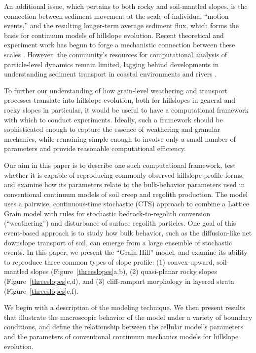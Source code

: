 \documentclass[esurf, manuscript]{copernicus}
\begin{document}
An additional issue, which pertains to both rocky and soil-mantled slopes, is the connection between sediment movement at the scale of individual ``motion events,'' and the resulting longer-term average sediment flux, which forms the basis for continuum models of hillslope evolution. Recent theoretical and experiment work has begun to forge a mechanistic connection between these scales \citep{culling1963soil,culling1965theory,furbish2009statistical,furbish2010divots,tucker2010trouble,gabet2012particle,lamb2013sediment}. However, the community's resources for computational analysis of particle-level dynamics remain limited, lagging behind developments in %
understanding sediment transport in coastal environments \citep{drake2001discrete} and rivers \citep{mcewan2001discrete,macvicar2006two,furbish2013probabilistic,schmeeckle2014numerical}.

To further our understanding of how grain-level weathering and transport processes translate into hillslope evolution, both for hillslopes in general and rocky slopes in particular, it would be useful to have a computational framework with which to conduct experiments. Ideally, such a framework should be sophisticated enough to capture the essence of weathering and granular mechanics, while remaining simple enough to involve only a small number of parameters and provide reasonable computational efficiency.

Our aim in this paper is to describe one such computational framework, test whether it is capable of reproducing commonly observed hillslope-profile forms, and examine how its parameters relate to the bulk-behavior parameters used in conventional continuum models of soil creep and regolith production. The model uses a pairwise, continuous-time stochastic (CTS) approach to combine a Lattice Grain model with rules for stochastic bedrock-to-regolith conversion (``weathering'') and disturbance of surface regolith particles. One goal of this event-based approach is to study how bulk behavior, such as the diffusion-like net downslope transport of soil, can emerge from a large ensemble of  stochastic events. In this paper, we present the ``Grain Hill'' model, and examine its ability to reproduce three common types of slope profile: (1) convex-upward, soil-mantled slopes (Figure~\ref{threeslopes}a,b), (2) quasi-planar rocky slopes (Figure~\ref{threeslopes}c,d), and (3) cliff-rampart morphology in layered strata (Figure~\ref{threeslopes}e,f).

We begin with a description of the modeling technique. We then present results that illustrate the macroscopic behavior of the model under a variety of boundary conditions, and define the relationship between the cellular model's parameters and the parameters of conventional continuum mechanics models for hillslope evolution.
\end{document}
